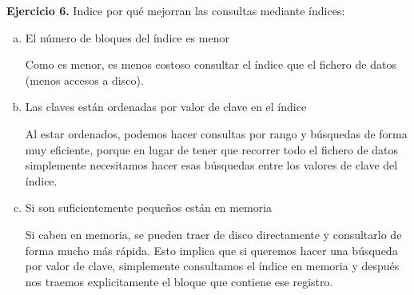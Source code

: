 \documentclass[12pt]{report}
\begin{document}
\textbf{Ejercicio 6.} Indice por qué mejorran las consultas mediante índices:
\begin{enumerate}[(a)]
\item El número de bloques del índice es menor

Como es menor, es menos costoso consultar el índice que el fichero de datos (menos accesos a disco).

\item Las claves están ordenadas por valor de clave en el índice

Al estar ordenados, podemos hacer consultas por rango y búsquedas de forma muy eficiente, porque en lugar de tener que recorrer todo el fichero de datos simplemente necesitamos hacer esas búsquedas entre los valores de clave del índice.

\item Si son suficientemente pequeños están en memoria

Si caben en memoria, se pueden traer de disco directamente y consultarlo de forma mucho más rápida. Esto implica que si queremos hacer una búsqueda por valor de clave, simplemente consultamos el índice en memoria y después nos traemos explicitamente el bloque que contiene ese registro.
\end{enumerate}
\end{document}
